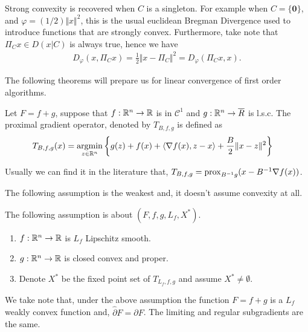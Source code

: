 \documentclass[12pt]{article}
\begin{document}
    Strong convexity is recovered when $C$ is a singleton. 
    For example when $C = \{\mathbf 0\}$, and $\varphi = (1/2)\Vert x\Vert^2$, this is the usual euclidean Bregman Divergence used to introduce functions that are strongly convex. 
    Furthermore, take note that $\Pi_C x \in D(x | C)$ is always true, hence we have
    \begin{align}
        D_\varphi(x, \Pi_C x) = \frac{1}{2}\Vert x - \Pi_C \Vert^2 = D_\varphi(\Pi_C x, x). 
    \end{align}
    \par
    The following theorems will prepare us for linear convergence of first order algorithms. 
    \begin{definition}\label{def:pg}
        Let $F = f + g$, suppose that $f : \mathbb R^n \rightarrow \mathbb R$ is in $\mathcal C^1$ and $g: \mathbb R^n \rightarrow \overline R$ is l.s.c. 
        The proximal gradient operator, denoted by $T_{B, f, g}$ is defined as
        \begin{align*}
            T_{B, f, g}(x) &= \mathop{\rm argmin}\limits_{z\in \mathbb R^n} \left\lbrace
                g(z) + f(x) + \langle \nabla f(x), z - x\rangle + \frac{B}{2}\Vert x - z\Vert^2
            \right\rbrace
        \end{align*}
    \end{definition}
    \begin{remark}
        Usually we can find it in the literature that, $T_{B, f, g} = \operatorname{prox}_{B^{-1}g}(x - B^{-1}\nabla f(x))$. 
    \end{remark}
    The following assumption is the weakest and, it doesn't assume convexity at all. 
    \begin{assumption}\label{ass:our-ass}
        The following assumption is about $(F, f, g, L_f, X^*)$. 
        \begin{enumerate}
            \item $f: \mathbb R^n \rightarrow \mathbb R$ is $L_f$ Lipschitz smooth. 
            \item $g: \mathbb R^n \rightarrow \mathbb R$ is closed convex and proper. 
            \item Denote $X^*$ be the fixed point set of $T_{L_f, f, g}$ and assume $X^* \neq \emptyset$. 
        \end{enumerate}
    \end{assumption}
    We take note that, under the above assumption the function $F = f + g$ is a $L_f$ weakly convex function and, $\widehat \partial F = \partial F$. 
    The limiting and regular subgradients are the same. 
\end{document}
